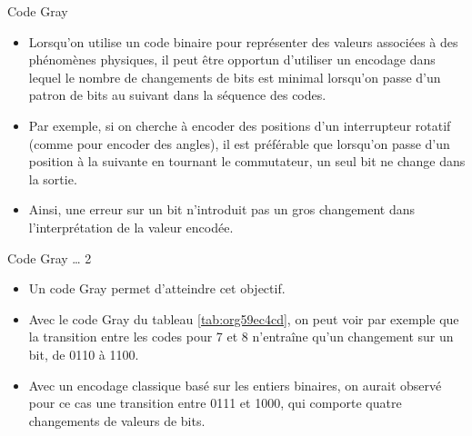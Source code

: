 \documentclass[presentation]{beamer}
\begin{document}
\begin{frame}[label={sec:org714ae00}]{Code Gray}
\begin{itemize}
\item Lorsqu'on utilise un code binaire pour représenter des valeurs associées à des phénomènes physiques, il peut être opportun d’utiliser un encodage dans lequel le nombre de changements de bits est minimal lorsqu'on passe d'un patron de bits au suivant dans la séquence des codes.

\item Par exemple, si on cherche à encoder des positions d'un interrupteur rotatif (comme pour encoder des angles), il est préférable que lorsqu'on passe d'un position à la suivante en tournant le commutateur, un seul bit ne change dans la sortie.

\item Ainsi, une erreur sur un bit n'introduit pas un gros changement dans l'interprétation de la valeur encodée.
\end{itemize}
\end{frame}

\begin{frame}[label={sec:orgb4f6c94}]{Code Gray \ldots{} 2}
\begin{itemize}
\item Un code Gray permet d'atteindre cet objectif.

\item Avec le code Gray du tableau \ref{tab:org59ec4cd}, on peut voir par exemple que la transition entre les codes pour 7 et 8 n’entraîne qu'un changement sur un bit, de 0110 à 1100.

\item Avec un encodage classique basé sur les entiers binaires, on aurait observé pour ce cas une transition entre 0111 et 1000, qui comporte quatre changements de valeurs de bits.
\end{itemize}
\end{frame}
\end{document}
